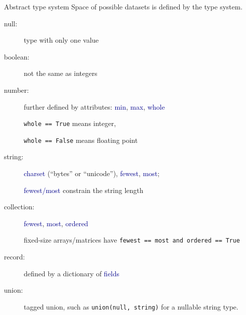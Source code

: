 \documentclass{beamer}
\begin{document}
\begin{frame}{Abstract type system}
\vspace{0.5 cm}
Space of possible datasets is defined by the type system.

\begin{description}
\item[null:] type with only one value
\item[boolean:] not the same as integers
\item[number:] further defined by attributes: \textcolor{darkblue}{min}, \textcolor{darkblue}{max}, \textcolor{darkblue}{whole}

{\tt whole == True} means integer,

{\tt whole == False} means floating point

\item[string:] \textcolor{darkblue}{charset} (``bytes'' or ``unicode''), \textcolor{darkblue}{fewest}, \textcolor{darkblue}{most};

\textcolor{darkblue}{fewest/most} constrain the string length

\item[collection:] \textcolor{darkblue}{fewest}, \textcolor{darkblue}{most}, \textcolor{darkblue}{ordered}

fixed-size arrays/matrices have {\tt fewest == most and ordered == True}

\item[record:] defined by a dictionary of \textcolor{darkblue}{fields}
\item[union:] tagged union, such as {\tt union(null, string)} for a nullable string type.
\end{description}
\end{frame}
\end{document}

